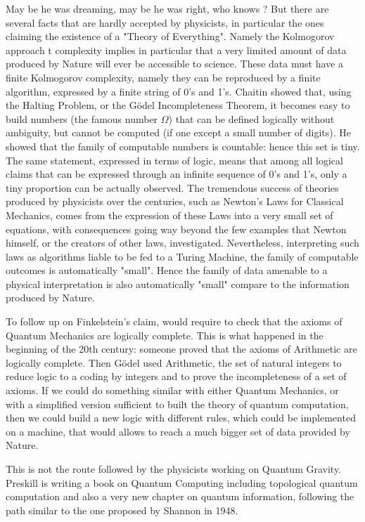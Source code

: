     May be he was dreaming, may be he was right, who knows ? But there are
    several facts that are hardly accepted by physicists, in particular the ones
    claiming the existence of a "Theory of Everything". Namely the Kolmogorov
    approach t complexity implies in particular that a very limited amount of
    data produced by Nature will ever be accessible to science. These data must
    have a finite Kolmogorov complexity, namely they can be reproduced by a
    finite algorithm, expressed by a finite string of 0's and 1's. Chaitin
    showed that, using the Halting Problem, or the G\"odel Incompleteness Theorem,
    it becomes easy to build numbers (the famous number $\Omega$) that can be defined
    logically without ambiguity, but cannot be computed (if one except a small
    number of digits). He showed that the family of computable numbers is
    countable: hence this set is tiny. The same statement, expressed in terms of
    logic, means that among all logical claims that can be expressed through an
    infinite sequence of 0's and 1's, only a tiny proportion can be actually
    observed.  The tremendous success of theories produced by physicists over
    the centuries, such as Newton's Laws for Classical Mechanics, comes from the
    expression of these Laws into a very small set of equations, with
    consequences going way beyond the few examples that Newton himself, or the
    creators of other laws, investigated. Nevertheless, interpreting such laws
    as algorithms liable to be fed to a Turing Machine, the family of computable
    outcomes is automatically "small". Hence the family of data amenable to a
    physical interpretation is also automatically "small" compare to the
    information produced by Nature.


    To follow up on Finkelstein's claim, would require to check that the axioms of
    Quantum Mechanics are logically complete. This is what happened in the
    beginning of the 20th century: someone proved that the axioms of Arithmetic
    are logically complete. Then G\"odel used Arithmetic, the set of natural
    integers to reduce logic to a coding by integers and to prove the
    incompleteness of a set of axioms. If we could do something similar with
    either Quantum Mechanics, or with a simplified version sufficient to built
    the theory of quantum computation, then we could build a new logic with
    different rules, which could be implemented on a machine, that would allows
    to reach a much bigger set of data provided by Nature.


This is not the route followed by the physicists working on Quantum
Gravity.
{Preskill} is writing a book on Quantum Computing including topological
quantum computation and also a very new chapter on quantum information,
following the path similar to the one proposed by Shannon in 1948.

